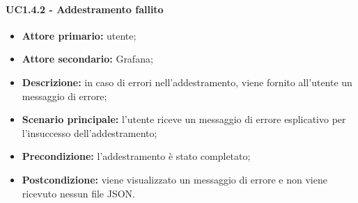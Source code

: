 \documentclass{article}
\begin{document}
	\paragraph{UC1.4.2 - Addestramento fallito}
	\begin{itemize}
		\item \textbf{Attore primario:} utente;
		\item \textbf{Attore secondario:} Grafana;
		\item \textbf{Descrizione:} in caso di errori nell'addestramento, viene fornito all'utente un messaggio di errore;
		\item \textbf{Scenario principale:} l'utente riceve un messaggio di errore esplicativo per l'insuccesso dell'addestramento;
		\item \textbf{Precondizione:} l'addestramento è stato completato;
		\item \textbf{Postcondizione:} viene visualizzato un messaggio di errore e non viene ricevuto nessun file JSON.
	\end{itemize}
\end{document}
